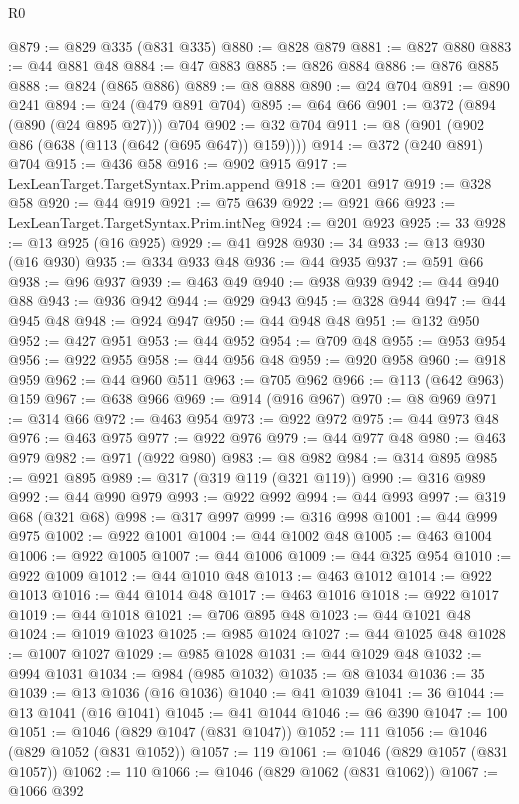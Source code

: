 \begin{lexlean}{R0}
\begin{coremodule}
@879 := @829 @335 (@831 @335)
@880 := @828 @879
@881 := @827 @880
@883 := @44 @881 @48
@884 := @47 @883
@885 := @826 @884
@886 := @876 @885
@888 := @824 (@865 @886)
@889 := @8 @888
@890 := @24 @704
@891 := @890 @241
@894 := @24 (@479 @891 @704)
@895 := @64 @66
@901 := @372 (@894 (@890 (@24 @895 @27))) @704
@902 := @32 @704
@911 := @8 (@901 (@902 @86 (@638 (@113 (@642 (@695 @647)) @159))))
@914 := @372 (@240 @891) @704
@915 := @436 @58
@916 := @902 @915
@917 := LexLeanTarget.TargetSyntax.Prim.append
@918 := @201 @917
@919 := @328 @58
@920 := @44 @919
@921 := @75 @639
@922 := @921 @66
@923 := LexLeanTarget.TargetSyntax.Prim.intNeg
@924 := @201 @923
@925 := 33
@928 := @13 @925 (@16 @925)
@929 := @41 @928
@930 := 34
@933 := @13 @930 (@16 @930)
@935 := @334 @933 @48
@936 := @44 @935
@937 := @591 @66
@938 := @96 @937
@939 := @463 @49
@940 := @938 @939
@942 := @44 @940 @88
@943 := @936 @942
@944 := @929 @943
@945 := @328 @944
@947 := @44 @945 @48
@948 := @924 @947
@950 := @44 @948 @48
@951 := @132 @950
@952 := @427 @951
@953 := @44 @952
@954 := @709 @48
@955 := @953 @954
@956 := @922 @955
@958 := @44 @956 @48
@959 := @920 @958
@960 := @918 @959
@962 := @44 @960 @511
@963 := @705 @962
@966 := @113 (@642 @963) @159
@967 := @638 @966
@969 := @914 (@916 @967)
@970 := @8 @969
@971 := @314 @66
@972 := @463 @954
@973 := @922 @972
@975 := @44 @973 @48
@976 := @463 @975
@977 := @922 @976
@979 := @44 @977 @48
@980 := @463 @979
@982 := @971 (@922 @980)
@983 := @8 @982
@984 := @314 @895
@985 := @921 @895
@989 := @317 (@319 @119 (@321 @119))
@990 := @316 @989
@992 := @44 @990 @979
@993 := @922 @992
@994 := @44 @993
@997 := @319 @68 (@321 @68)
@998 := @317 @997
@999 := @316 @998
@1001 := @44 @999 @975
@1002 := @922 @1001
@1004 := @44 @1002 @48
@1005 := @463 @1004
@1006 := @922 @1005
@1007 := @44 @1006
@1009 := @44 @325 @954
@1010 := @922 @1009
@1012 := @44 @1010 @48
@1013 := @463 @1012
@1014 := @922 @1013
@1016 := @44 @1014 @48
@1017 := @463 @1016
@1018 := @922 @1017
@1019 := @44 @1018
@1021 := @706 @895 @48
@1023 := @44 @1021 @48
@1024 := @1019 @1023
@1025 := @985 @1024
@1027 := @44 @1025 @48
@1028 := @1007 @1027
@1029 := @985 @1028
@1031 := @44 @1029 @48
@1032 := @994 @1031
@1034 := @984 (@985 @1032)
@1035 := @8 @1034
@1036 := 35
@1039 := @13 @1036 (@16 @1036)
@1040 := @41 @1039
@1041 := 36
@1044 := @13 @1041 (@16 @1041)
@1045 := @41 @1044
@1046 := @6 @390
@1047 := 100
@1051 := @1046 (@829 @1047 (@831 @1047))
@1052 := 111
@1056 := @1046 (@829 @1052 (@831 @1052))
@1057 := 119
@1061 := @1046 (@829 @1057 (@831 @1057))
@1062 := 110
@1066 := @1046 (@829 @1062 (@831 @1062))
@1067 := @1066 @392

\end{coremodule}
\end{lexlean}
